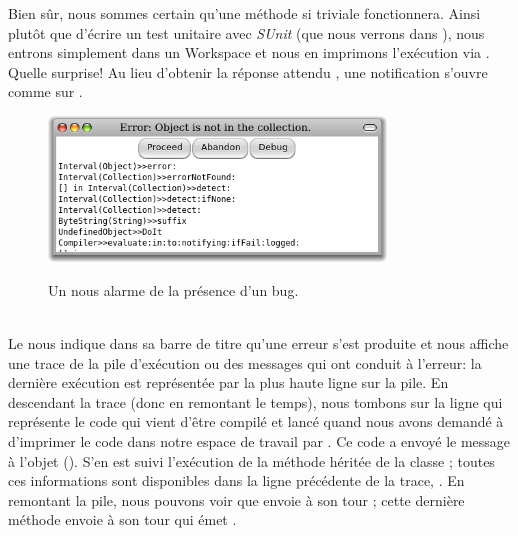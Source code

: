 \documentclass[a4paper,10pt,twoside]{book}
\begin{document}
Bien sûr, nous sommes certain qu'une méthode si triviale fonctionnera.
Ainsi plutôt que d'écrire un test unitaire avec \emph{SUnit} 
(que nous verrons dans ),
nous entrons simplement  dans un Workspace
et nous en imprimons l'exécution via .
Quelle surprise! Au lieu d'obtenir la réponse attendu , 
une notification  s'ouvre comme sur
.

\begin{figure}[btp]
	\begin{center}
		{\includegraphics[width=0.8\textwidth]{PreDebugWindow}}
	\end{center}
	\caption{Un  nous alarme de la présence d'un bug.}
\end{figure}

\\
Le  nous indique dans sa barre de titre
qu'une erreur s'est produite et nous affiche une trace de la pile d'exécution
ou  des messages qui ont conduit à l'erreur:
la dernière exécution est représentée par la plus haute ligne sur la pile.
En descendant la trace (donc en remontant le temps), nous tombons sur la ligne
  qui représente le code qui vient d'être compilé
et lancé quand nous avons demandé à \pharo d'imprimer 
le code  dans notre espace de travail par .
Ce code a envoyé le message  à
l'objet  ().
S'en est suivi l'exécution de la méthode  héritée de la
classe ;
toutes ces informations sont disponibles dans la ligne précédente de la trace,
.
En remontant la pile, nous pouvons voir que  envoie
à son tour ; cette dernière méthode envoie à son tour  qui émet 
.
\end{document}

